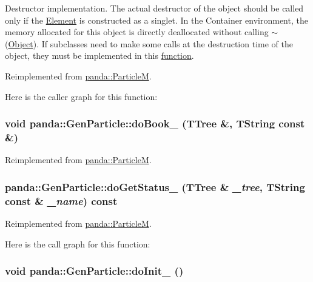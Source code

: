 Destructor implementation. The actual destructor of the object should be called only if the \hyperlink{classpanda_1_1Element}{Element} is constructed as a singlet. In the Container environment, the memory allocated for this object is directly deallocated without calling $\sim$(\hyperlink{classpanda_1_1Object}{Object}). If subclasses need to make some calls at the destruction time of the object, they must be implemented in this \hyperlink{namespacepanda_1_1function}{function}. 

Reimplemented from \hyperlink{classpanda_1_1ParticleM_abef15d28e6e33ee92c0b318bd41af2ca}{panda::ParticleM}.

Here is the caller graph for this function:\hypertarget{classpanda_1_1GenParticle_aae66df460d70150e146dd95392c7e781}{
\subsubsection[{doBook\_\-}]{\setlength{\rightskip}{0pt plus 5cm}void panda::GenParticle::doBook\_\- (TTree \&, \/  TString const \&)}}
\label{classpanda_1_1GenParticle_aae66df460d70150e146dd95392c7e781}


Reimplemented from \hyperlink{classpanda_1_1ParticleM_a55d6e7e91edbc88e980a0031c299ef18}{panda::ParticleM}.\hypertarget{classpanda_1_1GenParticle_a117dbbc192b9795838cbfbc75f0eceb8}{
\subsubsection[{doGetStatus\_\-}]{ panda::GenParticle::doGetStatus\_\- (TTree \& {\em \_\-tree}, \/  TString const \& {\em \_\-name}) const}}
\label{classpanda_1_1GenParticle_a117dbbc192b9795838cbfbc75f0eceb8}


Reimplemented from \hyperlink{classpanda_1_1ParticleM_a003a63672058369e9bbea413e055b1c1}{panda::ParticleM}.

Here is the call graph for this function:\hypertarget{classpanda_1_1GenParticle_a962c22c6afb1e9d0ef23eb70cfc809b5}{
\subsubsection[{doInit\_\-}]{\setlength{\rightskip}{0pt plus 5cm}void panda::GenParticle::doInit\_\- ()}}
\label{classpanda_1_1GenParticle_a962c22c6afb1e9d0ef23eb70cfc809b5}


